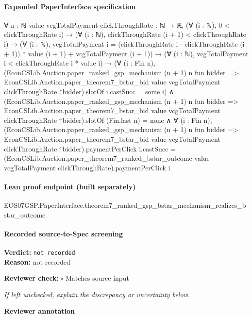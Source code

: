 \documentclass[10pt]{article}
\newcommand{\reviewerbox}{%
  \par\noindent\fbox{\parbox{0.96\linewidth}{\rule{0pt}{0.38in}}}\par
}
\newcommand{\reviewmatch}[1]{%
  \par\noindent\textbf{Reviewer check:} $\square$\; #1\par
  \noindent\emph{If left unchecked, explain the discrepancy or uncertainty below.}\par
}
\begin{document}
\paragraph{Expanded PaperInterface specification}
\begin{ReviewVerbatim}
∀ {n : ℕ} {value vcgTotalPayment clickThroughRate : ℕ → ℝ},
  (∀ (i : ℕ), 0 < clickThroughRate i) →
    (∀ (i : ℕ), clickThroughRate (i + 1) < clickThroughRate i) →
      (∀ (i : ℕ),
          vcgTotalPayment i =
            (clickThroughRate i - clickThroughRate (i + 1)) * value (i + 1) + vcgTotalPayment (i + 1)) →
        (∀ (i : ℕ), vcgTotalPayment i < clickThroughRate i * value i) →
          (∀ (i : Fin n),
              (EconCSLib.Auction.paper_ranked_gsp_mechanism (n + 1) n fun bidder =>
                      EconCSLib.Auction.paper_theorem7_bstar_bid value vcgTotalPayment clickThroughRate ↑bidder).slotOf
                  i.castSucc =
                some i) ∧
            (EconCSLib.Auction.paper_ranked_gsp_mechanism (n + 1) n fun bidder =>
                      EconCSLib.Auction.paper_theorem7_bstar_bid value vcgTotalPayment clickThroughRate ↑bidder).slotOf
                  (Fin.last n) =
                none ∧
              ∀ (i : Fin n),
                (EconCSLib.Auction.paper_ranked_gsp_mechanism (n + 1) n fun bidder =>
                        EconCSLib.Auction.paper_theorem7_bstar_bid value vcgTotalPayment clickThroughRate
                          ↑bidder).paymentPerClick
                    i.castSucc =
                  (EconCSLib.Auction.paper_theorem7_ranked_bstar_outcome value vcgTotalPayment
                        clickThroughRate).paymentPerClick
                    i
\end{ReviewVerbatim}

\paragraph{Lean proof endpoint (built separately)}\begin{ReviewVerbatim}
EOS07GSP.PaperInterface.theorem7_ranked_gsp_bstar_mechanism_realizes_bstar_outcome
\end{ReviewVerbatim}

\paragraph{Recorded source-to-Spec screening}
\textbf{Verdict:} \texttt{not recorded}
\\
\textbf{Reason:} not recorded
\reviewmatch{Matches source input}
\noindent\textbf{Reviewer annotation}\par
\reviewerbox
\clearpage
\hypertarget{source-claim-c52506a4136e9a4c}{}
\end{document}
